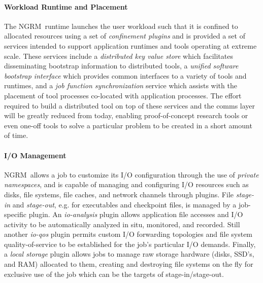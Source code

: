 \documentclass[10pt]{article}
\newcommand{\ngrm}{NGRM}
\begin{document}
\paragraph{Workload Runtime and Placement}
The \ngrm\ runtime launches the user workload such that it is confined
to allocated resources using a set of {\em confinement plugins}
and is provided a set of services intended to support application
runtimes and tools operating at extreme scale.
These services include a {\em distributed key value store} which facilitates
disseminating bootstrap information to distributed tools,
a {\em unified software bootstrap interface} which provides common
interfaces to a variety of tools and runtimes, and
a {\em job function synchronization} service which assists with the placement
of tool processes co-located with application processes.
The effort required to build a distributed tool on top of these services
and the comms layer will be greatly reduced from today, enabling
proof-of-concept research tools or even one-off tools to solve a particular
problem to be created in a short amount of time.

\paragraph{I/O Management}
\ngrm\ allows a job to customize its I/O configuration through the use
of {\em private namespaces}, and is capable of managing and configuring
I/O resources such as disks, file systems, file caches, and network channels
through plugins.
File {\em stage-in} and {\em stage-out}, e.g. for executables and
checkpoint files, is managed by a job-specific plugin.
An {\em io-analysis} plugin allows application file accesses and
I/O activity to be automatically analyzed in situ, monitored, and recorded.
Still another {\em io-qos} plugin permits custom I/O forwarding topologies
and file system quality-of-service to be established for the job's
particular I/O demands.  Finally, a  {\em local storage} plugin allows
jobs to manage raw storage hardware (disks, SSD's, and RAM) allocated
to them, creating and destroying file systems on the fly for exclusive
use of the job which can be the targets of stage-in/stage-out.













\appendix







\end{document}
